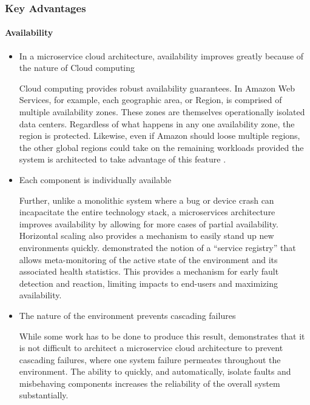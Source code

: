 \begin{frame}
  \frametitle{Key Advantages}
  \framesubtitle{Availability}
  \begin{itemize}

    \item<1-> In a microservice cloud architecture, availability improves greatly because of the nature of Cloud computing

           {\scriptsize{Cloud computing provides robust availability guarantees. In Amazon Web Services, for example, each geographic area, or Region, is comprised of multiple availability zones. These zones are themselves operationally isolated data centers. Regardless of what happens in any one availability zone, the region is protected. Likewise, even if Amazon should loose multiple regions, the other global regions could take on the remaining workloads provided the system is architected to take advantage of this feature \parencite{amazonRegionsZonesAmazon}. }}

    \item<2-> Each component is individually available

           {\scriptsize{Further, unlike a monolithic system where a bug or device crash can incapacitate the entire technology stack, a microservices architecture improves availability by allowing for more cases of partial availability. Horizontal scaling also provides a mechanism to easily stand up new environments quickly. \textcite{meiResearchHealthMonitoring2018} demonstrated the notion of a ``service registry'' that allows meta-monitoring of the active state of the environment and its associated health statistics. This provides a mechanism for early fault detection and reaction, limiting impacts to end-users and maximizing availability.}}

    \item<3-> The nature of the environment prevents cascading failures

           {\scriptsize{While some work has to be done to produce this result, \textcite{kennedya.torkuraIntegratingContinuousSecurity2017} demonstrates that it is not difficult to architect a microservice cloud architecture to prevent cascading failures, where one system failure permeates throughout the environment. The ability to quickly, and automatically, isolate faults and misbehaving components increases the reliability of the overall system substantially.   }}


  \end{itemize}
\end{frame}
